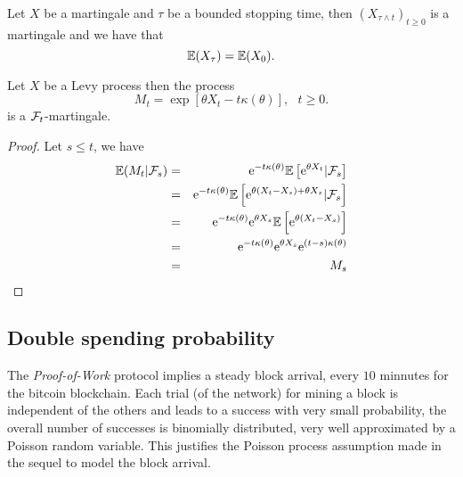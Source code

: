 \begin{theo}\label{theo:optional_stopping_theorem_continuous_martingale}
Let $X$ be a martingale and $\tau$ be a bounded stopping time, then $(X_{\tau\land t})_{t\geq 0}$ is a martingale and we have that
$$
\mathbb{E}(X_\tau) = \mathbb{E}(X_0).
$$
\end{theo}
\begin{prop}\label{prop:Wald_martingale_Levy}
Let $X$ be a Levy process then the process 
$$
M_t = \exp\left[\theta X_t - t\kappa(\theta)\right],\text{ }t\geq 0.
$$
is a $\mathcal{F}_t$-martingale.
\end{prop}
\begin{proof}
Let $s\leq t$, we have
\begin{eqnarray*}
\mathbb{E}(M_t|\mathcal{F}_s)&=&\mathrm{e}^{-t\kappa(\theta)}\mathbb{E}\left[\mathrm{e}^{\theta X_t}|\mathcal{F}_s\right]\\
&=&\mathrm{e}^{-t\kappa(\theta)}\mathbb{E}\left[\mathrm{e}^{\theta (X_t-X_s) +\theta X_s}|\mathcal{F}_s\right]\\
&=&\mathrm{e}^{-t\kappa(\theta)}\mathrm{e}^{\theta X_s}\mathbb{E}\left[\mathrm{e}^{\theta (X_t-X_s)}\right]\\
&=&\mathrm{e}^{-t\kappa(\theta)}\mathrm{e}^{\theta X_s}\mathrm{e}^{(t-s)\kappa(\theta)}\\
&=&M_s\\
\end{eqnarray*}
\end{proof}


\subsection{Double spending probability}\label{ssec:double_spending_counting_process_dsp}
The \textit{Proof-of-Work} protocol implies a steady block arrival, every $10$ minnutes for the bitcoin blockchain. Each trial (of the network) for mining a block is independent of the others and leads to a success with very small probability, the overall number of successes is binomially distributed, very well approximated by a
Poisson random variable. This justifies the Poisson process assumption made in the sequel to model the block arrival.\\

